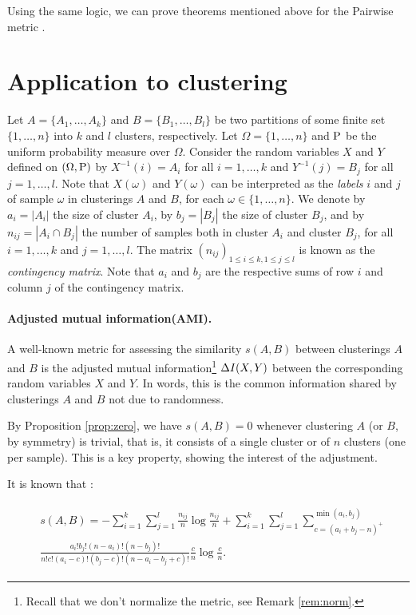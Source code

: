 Using the same logic, we can prove theorems mentioned above for the Pairwise metric \cite{Lazarenko2021pairwise}. 


\section{Application to clustering}
\label{sec:cluster}

Let $A = \{A_1,\ldots,A_k\}$ and $B= \{B_1,\ldots,B_l\}$  be two partitions of some finite set $\{1,\ldots,n\}$ into $k$ and $l$ clusters, respectively. Let  $\Omega = \{1,\ldots,n\}$ and $\P$ be  the uniform probability measure over $\Omega$. 
Consider the  random variables $X$ and $Y$ defined on $(\Omega, \P)$ by $X^{-1}(i) = A_i$ for all $i=1,\ldots,k$ and 
$Y^{-1}(j) = B_j$ for all $j=1,\ldots,l$. Note that $X(\omega)$ and $Y(\omega)$ can be interpreted as the {\it labels} $i$ and $j$ of sample $\omega$ in clusterings $A$ and $B$, for each $\omega\in \{1,\ldots,n\}$. We denote by $a_i = |A_i|$ the size of cluster $A_i$, by $b_j = |B_j|$ the size of cluster $B_j$, and by $n_{ij} = |A_i \cap B_j|$ the number of samples both in cluster $A_i$ and  cluster $B_j$, for all $i=1,\ldots,k$ and $j=1,\ldots,l$. The matrix $(n_{ij})_{1\le i\le k, 1\le j\le l}$ is known as the {\it contingency matrix}. Note that $a_i$ and $b_j$ are  the respective sums of row $i$  and column $j$ of the contingency matrix.


\paragraph{Adjusted mutual information(AMI).} A well-known metric for assessing the  
similarity $s(A,B)$ between clusterings $A$ and $B$ is  the adjusted mutual information\footnote{Recall that we don't normalize the metric, see Remark \ref{rem:norm}.}  $\ia(X,Y)$ between the corresponding random variables $X$ and $Y$. 
In words, this is the common information shared by clusterings $A$ and $B$ not due to randomness. 

By Proposition \ref{prop:zero}, we have $s(A,B)=0$ whenever clustering $A$ (or $B$, by symmetry) is trivial, that is, it consists of  a single cluster or of $n$ clusters (one per sample). This is a key property, showing the interest of the adjustment.

It is known that \cite{vinh2010information}:

\begin{align}\label{eq:ami}
\begin{split}
&s(A,B) = -\sum_{i=1}^k\sum_{j=1}^l \frac {n_{ij}}n \log \frac {n_{ij}}n + \sum_{i=1}^k\sum_{j=1}^l \sum_{c = (a_i+b_j - n)^+}^{\min(a_i, b_j)} \\
&\frac{a_i!b_j!(n-a_i)!(n-b_j)!}
{n!c!(a_i-c)!(b_j-c)!(n-a_i-b_j+c)!}\frac {c}n \log \frac {c}n.
\end{split}
\end{align}

